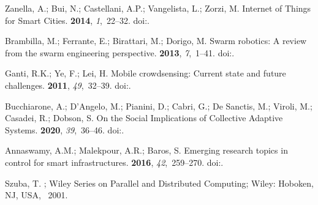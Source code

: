 \documentclass[jsan,article,accept,moreauthors,pdftex]{Definitions/mdpi}
\begin{document}
\begin{thebibliography}{999}
Zanella, A.; Bui, N.; Castellani, A.P.; Vangelista, L.; Zorzi, M.
\newblock Internet of Things for Smart Cities.
 {\bf 2014}, {\em 1},~22--32.
\newblock
  doi:{\href{https://doi.org/10.1109/JIOT.2014.2306328}{}}.

Brambilla, M.; Ferrante, E.; Birattari, M.; Dorigo, M.
\newblock Swarm robotics: A review from the swarm engineering perspective.
 {\bf 2013}, {\em 7},~1--41.
\newblock
  doi:{\href{https://doi.org/10.1007/s11721-012-0075-2}{}}.

Ganti, R.K.; Ye, F.; Lei, H.
\newblock Mobile crowdsensing: Current state and future challenges.
 {\bf 2011}, {\em 49},~32--39.
\newblock
  doi:{\href{https://doi.org/10.1109/MCOM.2011.6069707}{}}.

Bucchiarone, A.; D'Angelo, M.; Pianini, D.; Cabri, G.; {De Sanctis}, M.;
  Viroli, M.; Casadei, R.; Dobson, S.
\newblock On the Social Implications of Collective Adaptive Systems.
 {\bf 2020}, {\em 39},~36--46.
\newblock
  doi:{\href{https://doi.org/10.1109/MTS.2020.3012324}{}}.

Annaswamy, A.M.; Malekpour, A.R.; Baros, S.
\newblock Emerging research topics in control for smart infrastructures.
 {\bf 2016}, {\em 42},~259--270.
\newblock
  doi:{\href{https://doi.org/10.1016/j.arcontrol.2016.10.001}{}}.

Szuba, T.
; Wiley Series on Parallel
  and Distributed Computing; Wiley: Hoboken, NJ, USA,~ 2001.%


\end{thebibliography}
\end{document}
